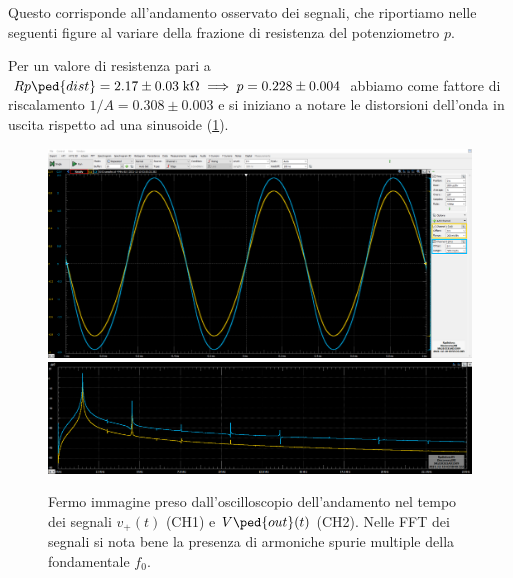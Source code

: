 \documentclass[10pt, a4paper, italian]{article}
\begin{document}
Questo corrisponde all'andamento osservato dei segnali, che riportiamo
nelle seguenti figure al variare della frazione di resistenza del
potenziometro $p$. 

Per un valore di resistenza pari a
$Rp\ped{dist} = 2.17 \pm 0.03 \; \si{k\ohm} \implies p = 0.228 \pm 0.004$ 
abbiamo come fattore di riscalamento $1/A = 0.308 \pm 0.003$
e si iniziano a notare le distorsioni dell'onda in uscita rispetto ad una
sinusoide (\cref{fig: Rpdist}).
\begin{figure}[htbp]
	\begin{center}
	\includegraphics[width=\textwidth]{Rpdistosc800mV}
	\includegraphics[width=\textwidth]{Rpdistosc800mVfft}
	\caption{Fermo immagine preso dall'oscilloscopio dell'andamento nel tempo dei
	segnali $v_+ (t)$ (CH1) e $V\ped{out} (t)$ (CH2). Nelle FFT dei segnali si
	nota bene la presenza di armoniche spurie multiple della fondamentale $f_0$.
	\label{fig: Rpdist}}
	\end{center}
\end{figure}
\end{document}
